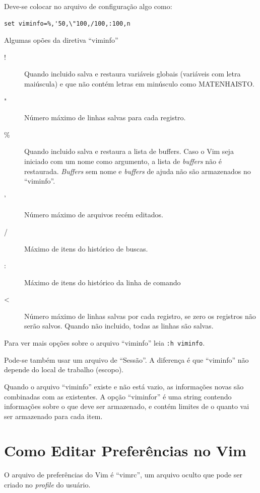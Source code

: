 \documentclass[10pt,a4paper,openany]{book}
\begin{document}
Deve-se colocar no arquivo de configuração algo como:
	
\begin{verbatim}
set viminfo=%,'50,\"100,/100,:100,n
\end{verbatim}

Algumas opões da diretiva ``viminfo''

\begin{description}
\item [!] Quando incluido salva e restaura variáveis globais (variáveis
com letra maiúscula) e que não contém letras em minúsculo como MATENHAISTO.

\item ["] Número máximo de linhas salvas para cada registro.

\item [\%] Quando incluido salva e restaura a lista de buffers. Caso o Vim seja 
iniciado com um nome como argumento, a lista de {\em buffers} não é restaurada. {\em Buffers} sem
nome e {\em buffers} de ajuda não são armazenados no ``viminfo''.
                                      
\item ['] Número máximo de arquivos recém editados.

\item [/] Máximo de itens do histórico de buscas.

\item [:] Máximo de itens do histórico da linha de comando

\item [<] Número máximo de linhas salvas por cada registro, se zero
os registros não serão salvos. Quando não incluido, todas as linhas são salvas.

\end{description}

Para ver mais opções sobre o arquivo ``viminfo'' leia {\tt :h viminfo}.

Pode-se também usar um arquivo de ``Sessão''. A diferença é que ``viminfo'' não 
depende do local de trabalho (escopo).

Quando o arquivo ``viminfo'' existe e não está vazio, as informações novas
são combinadas com as existentes. A opção ``viminfor'' é uma string contendo
informações sobre o que deve ser armazenado, e contém limites de o quanto 
vai ser armazenado para cada item.

\chapter{Como Editar Preferências no Vim}\label{cha:Como editar preferências no Vim}
O arquivo de preferências do Vim é ``vimrc'', um arquivo oculto que
pode ser criado no {\em profile} do usuário.
\end{document}

